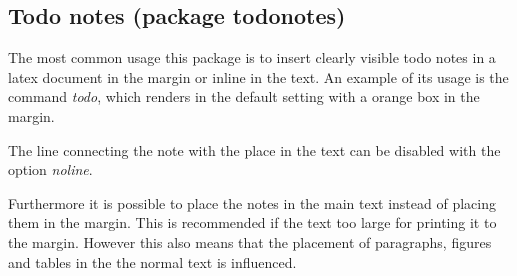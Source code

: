 
\subsection{Todo notes (package todonotes)}

\begin{filecontents*}{\democodefile}
The most common usage this package is to insert clearly visible todo notes in 
a latex document in the margin or inline 
in the text. An example of its usage is the command \emph{todo}, which 
renders in the default setting with a orange box in the margin.

The line connecting the note with the place in the text can be disabled 
with the option \emph{noline}.

Furthermore it is possible to place the notes in the main text instead 
of placing them in the margin. This is recommended if the text too large for
printing it to the margin. However this also means that the placement of 
paragraphs, figures and tables in the the normal text is influenced.
\end{filecontents*}

%

\begin{filecontents*}{\democodefile}
\end{filecontents*}

%




